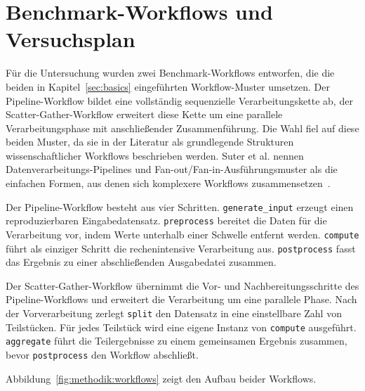 \section{Benchmark-Workflows und Versuchsplan}
\label{sec:methodik:versuchsplan}

Für die Untersuchung wurden zwei Benchmark-Workflows entworfen, die
die beiden in Kapitel~\ref{sec:basics} eingeführten Workflow-Muster
umsetzen. Der Pipeline-Workflow bildet eine vollständig
sequenzielle Verarbeitungskette ab, der Scatter-Gather-Workflow
erweitert diese Kette um eine parallele Verarbeitungsphase mit
anschließender Zusammenführung. Die Wahl fiel auf diese beiden
Muster, da sie in der Literatur als grundlegende Strukturen
wissenschaftlicher Workflows beschrieben werden. Suter et al.
nennen Datenverarbeitungs-Pipelines und
Fan-out/Fan-in-Ausführungsmuster als die einfachen Formen, aus
denen sich komplexere Workflows
zusammensetzen~\cite[S.~4]{suter2026terminology}.

Der Pipeline-Workflow besteht aus vier Schritten.
\texttt{generate\_input} erzeugt einen reproduzierbaren
Eingabedatensatz. \texttt{preprocess} bereitet die Daten für die
Verarbeitung vor, indem Werte unterhalb einer Schwelle entfernt
werden. \texttt{compute} führt als einziger Schritt die
rechenintensive Verarbeitung aus. \texttt{postprocess} fasst das
Ergebnis zu einer abschließenden Ausgabedatei zusammen.

Der Scatter-Gather-Workflow übernimmt die Vor- und
Nachbereitungsschritte des Pipeline-Workflows und erweitert die
Verarbeitung um eine parallele Phase. Nach der Vorverarbeitung
zerlegt \texttt{split} den Datensatz in eine einstellbare Zahl von
Teilstücken. Für jedes Teilstück wird eine eigene Instanz von
\texttt{compute} ausgeführt. \texttt{aggregate} führt die
Teilergebnisse zu einem gemeinsamen Ergebnis zusammen, bevor
\texttt{postprocess} den Workflow abschließt.

Abbildung~\ref{fig:methodik:workflows} zeigt den Aufbau beider
Workflows.

